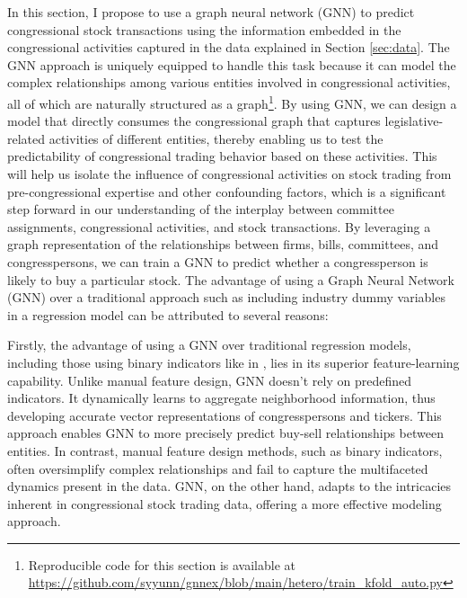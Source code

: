 \documentclass[15pt,letterpaper]{article}
\begin{document}
In this section, I propose to use a graph neural network (GNN) \citep{gnn1, gnn2, gnn3, gnn4} to predict congressional stock transactions using the information embedded in the congressional activities captured in the data explained in Section \ref{sec:data}. The GNN approach is uniquely equipped to handle this task because it can model the complex relationships among various entities involved in congressional activities, all of which are naturally structured as a graph\footnote{Reproducible code for this section is available at \url{https://github.com/syyunn/gnnex/blob/main/hetero/train_kfold_auto.py}}.
By using GNN, we can design a model that directly consumes the congressional graph that captures legislative-related activities of different entities, thereby enabling us to test the predictability of congressional trading behavior based on these activities. This will help us isolate the influence of congressional activities on stock trading from pre-congressional expertise and other confounding factors, which is a significant step forward in our understanding of the interplay between committee assignments, congressional activities, and stock transactions.
By leveraging a graph representation of the relationships between firms, bills, committees, and congresspersons, we can train a GNN to predict whether a congressperson is likely to buy a particular stock. 
The advantage of using a Graph Neural Network (GNN) over a traditional approach such as including industry dummy variables in a regression model can be attributed to several reasons:


Firstly, the advantage of using a GNN over traditional regression models, including those using binary indicators like in \cite{eg14}, lies in its superior feature-learning capability. Unlike manual feature design, GNN doesn't rely on predefined indicators. It dynamically learns to aggregate neighborhood information, thus developing accurate vector representations of congresspersons and tickers. This approach enables GNN to more precisely predict buy-sell relationships between entities. In contrast, manual feature design methods, such as binary indicators, often oversimplify complex relationships and fail to capture the multifaceted dynamics present in the data. GNN, on the other hand, adapts to the intricacies inherent in congressional stock trading data, offering a more effective modeling approach.
\end{document}
